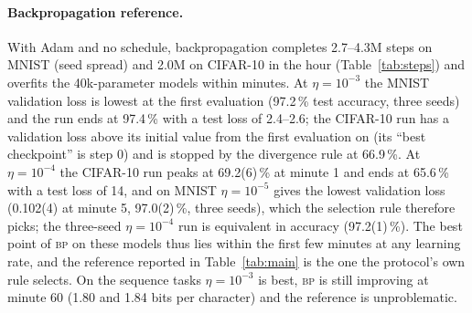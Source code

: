 \documentclass{article}
\newcommand{\method}[1]{\textsc{#1}}
\newcommand{\BP}{\method{bp}}
\begin{document}
\paragraph{Backpropagation reference.}
With Adam and no schedule, backpropagation completes 2.7--4.3M steps on MNIST (seed spread) and 2.0M on
CIFAR-10 in the hour (Table~\ref{tab:steps}) and overfits the 40k-parameter models
within minutes. At $\eta=10^{-3}$ the MNIST validation loss is lowest at the first
evaluation (97.2\,\% test accuracy, three seeds) and the run ends at 97.4\,\% with a
test loss of 2.4--2.6; the CIFAR-10 run has a validation loss above its initial value
from the first evaluation on (its ``best checkpoint'' is step 0) and is stopped by the
divergence rule at 66.9\,\%. At $\eta=10^{-4}$ the CIFAR-10 run peaks at 69.2(6)\,\%
at minute 1 and ends at 65.6\,\% with a test loss of 14, and on MNIST
$\eta=10^{-5}$ gives the lowest validation loss (0.102(4) at minute 5, 97.0(2)\,\%,
three seeds), which the selection rule therefore picks; the three-seed $\eta=10^{-4}$
run is equivalent in accuracy (97.2(1)\,\%). The best point of \BP{} on these models thus lies within the
first few minutes at any learning rate, and the reference reported in
Table~\ref{tab:main} is the one the protocol's own rule selects. On the sequence tasks
$\eta=10^{-3}$ is best, \BP{} is still improving at minute 60 (1.80 and 1.84 bits
per character) and the reference is unproblematic.

\begin{table}[t]
  \caption{Backpropagation reference under the stage-2 protocol: test accuracy (\%) or
  bits per character at the best validation checkpoint (with its minute) and at the end
  of the hour, for learning rates $\eta$ and decoupled weight decay (AdamW). The
  reference of Table~\ref{tab:main} is the row with the lowest validation loss on each
  task ($10^{-5}$ on MNIST, $10^{-4}$ on CIFAR-10, $10^{-3}$ on both sequence tasks);
  the $\eta=0.01$ image rows are stage-1 runs. A dagger marks a run stopped by the
  divergence rule (over-confident, not collapsed, in every daggered case).}
  \label{tab:bp}
  \centering
  \footnotesize
  \setlength{\tabcolsep}{3pt}
  \resizebox{\linewidth}{!}{}
\end{table}
\end{document}
